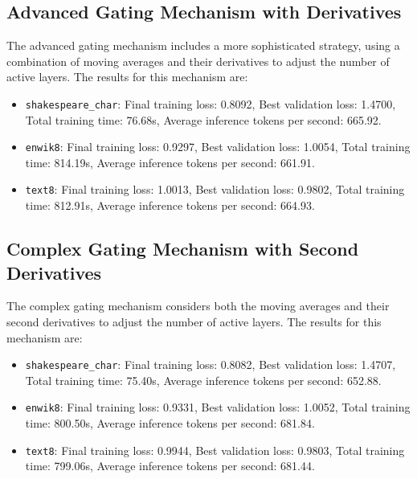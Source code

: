 \documentclass{article} %
\begin{document}
\subsection{Advanced Gating Mechanism with Derivatives}
The advanced gating mechanism includes a more sophisticated strategy, using a combination of moving averages and their derivatives to adjust the number of active layers. The results for this mechanism are:
\begin{itemize}
    \item \texttt{shakespeare\_char}: Final training loss: 0.8092, Best validation loss: 1.4700, Total training time: 76.68s, Average inference tokens per second: 665.92.
    \item \texttt{enwik8}: Final training loss: 0.9297, Best validation loss: 1.0054, Total training time: 814.19s, Average inference tokens per second: 661.91.
    \item \texttt{text8}: Final training loss: 1.0013, Best validation loss: 0.9802, Total training time: 812.91s, Average inference tokens per second: 664.93.
\end{itemize}

\subsection{Complex Gating Mechanism with Second Derivatives}
The complex gating mechanism considers both the moving averages and their second derivatives to adjust the number of active layers. The results for this mechanism are:
\begin{itemize}
    \item \texttt{shakespeare\_char}: Final training loss: 0.8082, Best validation loss: 1.4707, Total training time: 75.40s, Average inference tokens per second: 652.88.
    \item \texttt{enwik8}: Final training loss: 0.9331, Best validation loss: 1.0052, Total training time: 800.50s, Average inference tokens per second: 681.84.
    \item \texttt{text8}: Final training loss: 0.9944, Best validation loss: 0.9803, Total training time: 799.06s, Average inference tokens per second: 681.44.
\end{itemize}

\end{document}
